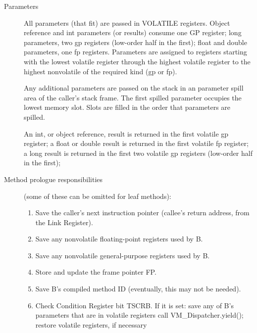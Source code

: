 
\begin{description}
\item[Parameters]

    All parameters (that fit) are passed in VOLATILE registers.  Object
    reference and int parameters (or results) consume one GP register; long
    parameters, two gp registers (low-order half in the first);  float and
    double parameters, one fp registers.  Parameters are assigned to 
registers
    starting with the lowest volatile register through the highest volatile
    register to the highest nonvolatile of the required kind (gp or fp).

    Any additional parameters are passed on the stack in an parameter spill
    area of the caller's stack frame.  The first spilled parameter occupies
    the lowest memory slot.  Slots are filled in the order that parameters
    are spilled.

    An int, or object reference, result is returned in the first volatile
    gp register; a float or double result is returned in the first volatile
    fp register; a long result is returned in the first two volatile gp
    registers (low-order half in the first);

\item [Method prologue responsibilities] (some of these can be omitted for leaf
  methods):

\begin{enumerate}
\item Save the caller's next instruction pointer (callee's return address,
       from the Link Register).

\item Save any nonvolatile floating-point registers used by B.

\item Save any nonvolatile general-purpose registers used by B.

\item Store and update the frame pointer FP.

\item Save B's compiled method ID (eventually, this may not be needed).

\item Check Condition Register bit TSCRB.  If it is set:
         save any of B's parameters that are in volatile registers
         call VM\_Dispatcher.yield();
         restore volatile registers, if necessary
\end{enumerate}


\end{description}
